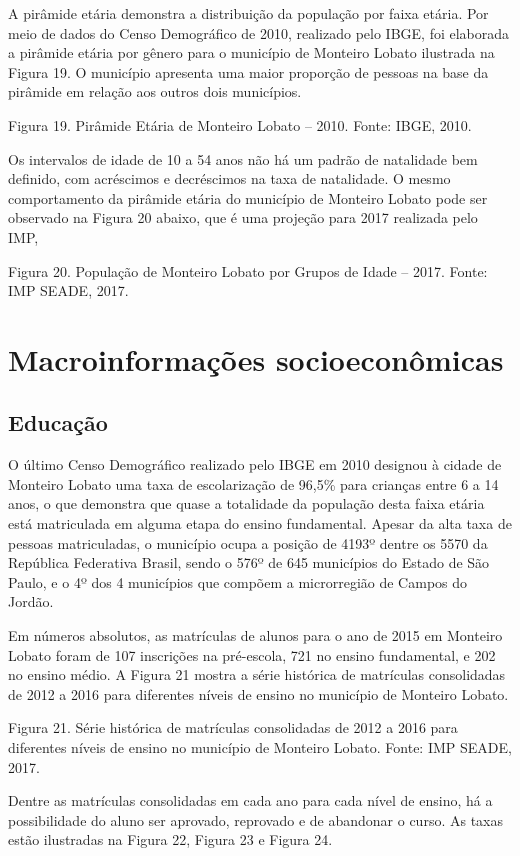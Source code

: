 A pirâmide etária demonstra a distribuição da população por faixa etária. Por meio de dados do Censo Demográfico de 2010, realizado pelo IBGE, foi elaborada a pirâmide etária por gênero para o município de Monteiro Lobato ilustrada na Figura 19. O município apresenta uma maior proporção de pessoas na base da pirâmide em relação aos outros dois municípios.

 
Figura 19.  Pirâmide Etária de Monteiro Lobato – 2010.
Fonte: IBGE, 2010.

Os intervalos de idade de 10 a 54 anos não há um padrão de natalidade bem definido, com acréscimos e decréscimos na taxa de natalidade. O mesmo comportamento da pirâmide etária do município de Monteiro Lobato pode ser observado na Figura 20 abaixo, que é uma projeção para 2017 realizada pelo IMP,  
 
Figura 20. População de Monteiro Lobato por Grupos de Idade – 2017.
Fonte: IMP SEADE, 2017.

\section{Macroinformações socioeconômicas}
\subsection{Educação}

O último Censo Demográfico realizado pelo IBGE em 2010 designou à cidade de Monteiro Lobato uma taxa de escolarização de 96,5\% para crianças entre 6 a 14 anos, o que demonstra que quase a totalidade da população desta faixa etária está matriculada em alguma etapa do ensino fundamental. Apesar da alta taxa de pessoas matriculadas, o município ocupa a posição de 4193º dentre os 5570 da República Federativa Brasil, sendo o 576º de 645 municípios do Estado de São Paulo, e o 4º dos 4 municípios que compõem a microrregião de Campos do Jordão.

Em números absolutos, as matrículas de alunos para o ano de 2015 em Monteiro Lobato foram de 107 inscrições na pré-escola, 721 no ensino fundamental, e 202 no ensino médio. A Figura 21 mostra a série histórica de matrículas consolidadas de 2012 a 2016 para diferentes níveis de ensino no município de Monteiro Lobato.

Figura 21. Série histórica de matrículas consolidadas de 2012 a 2016 para diferentes níveis de ensino no município de Monteiro Lobato.
Fonte: IMP SEADE, 2017.

Dentre as matrículas consolidadas em cada ano para cada nível de ensino, há a possibilidade do aluno ser aprovado, reprovado e de abandonar o curso. As taxas estão ilustradas na Figura 22, Figura 23 e Figura 24.

